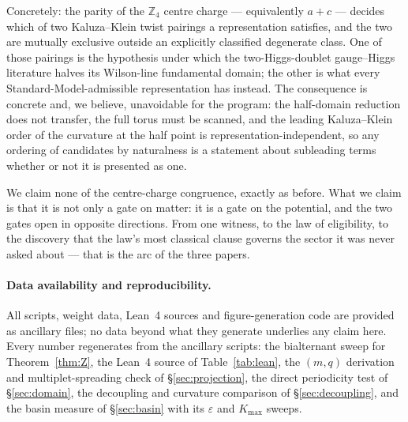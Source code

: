 \documentclass[11pt,a4paper]{article}
\newcommand{\ZZ}{\mathbb{Z}}
\begin{document}
Concretely: the parity of the $\ZZ_4$ centre charge
--- equivalently $a+c$ --- decides which of two Kaluza--Klein twist pairings a representation
satisfies, and the two are mutually exclusive outside an explicitly classified degenerate
class. One of those pairings is the hypothesis under which the two-Higgs-doublet
gauge--Higgs literature halves its Wilson-line fundamental domain; the other is what every
Standard-Model-admissible representation has instead. The consequence is concrete and, we
believe, unavoidable for the program: the half-domain reduction does not transfer, the full
torus must be scanned, and the leading Kaluza--Klein order of the curvature at the half point
is representation-independent, so any ordering of candidates by naturalness is a statement
about subleading terms whether or not it is presented as one.

We claim none of the centre-charge congruence, exactly as before. What we claim is that it is
not only a gate on matter: it is a gate on the potential, and the two gates open in opposite
directions. From one witness, to the law of eligibility, to the discovery that the law's most
classical clause governs the sector it was never asked about --- that is the arc of the three
papers.

\paragraph{Data availability and reproducibility.} All scripts, weight data, Lean~4 sources
and figure-generation code are provided as ancillary files; no data beyond what they generate
underlies any claim here. Every number regenerates from the ancillary scripts: the
bialternant sweep for Theorem~\ref{thm:Z}, the Lean~4 source of Table~\ref{tab:lean}, the
$(m,q)$ derivation and multiplet-spreading check of \S\ref{sec:projection}, the direct
periodicity test of \S\ref{sec:domain}, the decoupling and curvature comparison of
\S\ref{sec:decoupling}, and the basin measure of \S\ref{sec:basin} with its $\varepsilon$
and $K_{\max}$ sweeps.
\end{document}
